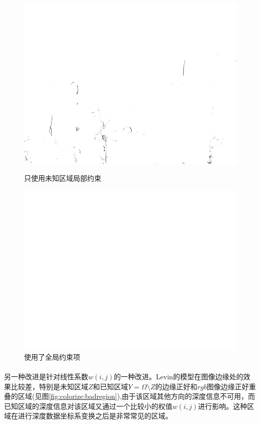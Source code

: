 \documentclass[UTF8]{ctexart}
\newcommand{\myciteup}[1]{\textsuperscript{\textsuperscript{\cite{#1}}}}
\begin{document}
\begin{sloppypar}
\begin{figure}[htbp]
\begin{minipage}[t]{0.5\linewidth}
            \centering
            \includegraphics[scale=0.25]{figure/colorize_only_in_z.png}
            \caption{\small 只使用未知区域局部约束}
            \label{fig:colorize:onlyz}
        \end{minipage}
        \begin{minipage}[t]{0.5\linewidth}
            \centering
            \includegraphics[scale=0.25]{figure/result_colorized_allregion_noseg.png}
            \caption{\small 使用了全局约束项}
            \label{fig:colorize:allregion}
        \end{minipage}
    \end{figure}\par
    另一种改进是针对线性系数$w(i,j)$的一种改进。Levin\myciteup{levin2004}的模型在图像边缘处的效果比较差，特别是未知区域$Z$和已知区域$Y=\Omega \setminus Z$的边缘正好和$rgb$图像边缘正好重叠的区域(见图\ref{fig:colorize:badregion}),由于该区域其他方向的深度信息不可用，而已知区域的深度信息对该区域又通过一个比较小的权值$w(i,j)$进行影响。这种区域在进行深度数据坐标系变换之后是非常常见的区域。

\end{sloppypar}
\end{document}
